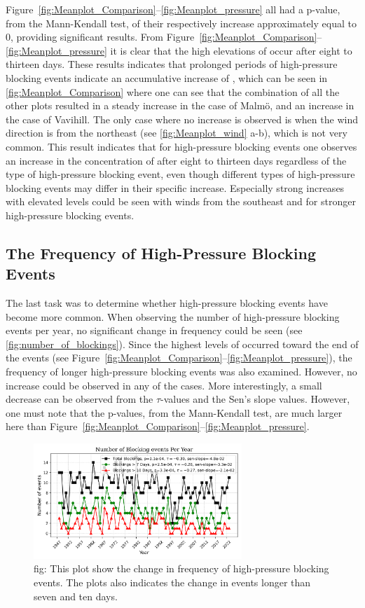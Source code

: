Figure~\ref{fig:Meanplot_Comparison}--\ref{fig:Meanplot_pressure} all had a p-value, from the Mann-Kendall test, of their respectively increase approximately equal to 0, providing significant results. From Figure~\ref{fig:Meanplot_Comparison}--\ref{fig:Meanplot_pressure} it is clear that the high elevations of \PM occur after eight to thirteen days. These results indicates that prolonged periods of high-pressure blocking events indicate an accumulative increase of \PM, which can be seen in \autoref{fig:Meanplot_Comparison} where one can see that the combination of all the other plots resulted in a steady increase in the case of Malmö, and an increase in the case of Vavihill. The only case where no increase is observed is when the wind direction is from the northeast (see \autoref{fig:Meanplot_wind} a-b), which is not very common. This result indicates that for high-pressure blocking events one observes an increase in the concentration of \PM after eight to thirteen days regardless of the type of high-pressure blocking event, even though different types of high-pressure blocking events may differ in their specific increase. Especially strong increases with elevated \PM levels could be seen with winds from the southeast and for stronger high-pressure blocking events. 

\subsection{The Frequency of High-Pressure Blocking Events}
The last task was to determine whether high-pressure blocking events have become more common. When observing the number of high-pressure blocking events per year, no significant change in frequency could be seen (see \autoref{fig:number_of_blockings}). Since the highest levels of \PM  occurred toward the end of the events (see Figure~\ref{fig:Meanplot_Comparison}--\ref{fig:Meanplot_pressure}), the frequency of longer high-pressure blocking events was also examined. However, no increase could be observed in any of the cases. More interestingly, a small decrease can be observed from the $\tau$-values and the Sen's slope values. However, one must note that the p-values, from the Mann-Kendall test, are much larger here than Figure~\ref{fig:Meanplot_Comparison}--\ref{fig:Meanplot_pressure}. 

\begin{figure}[H]
    \centering
    \includegraphics[width=0.7\textwidth]{Figures/BlockingsPerYear.png}
    \caption{fig: This plot show the change in frequency of high-pressure blocking events. The plots also indicates the change in events longer than seven and ten days. }
    \label{fig:number_of_blockings}
\end{figure}

